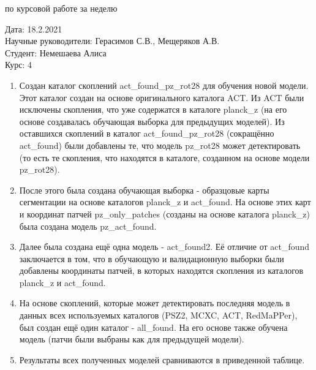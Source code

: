\documentclass{article}
\begin{document}
\begin{center}{ по курсовой работе за неделю\\}\end{center}
Дата: 18.2.2021\\
Научные руководители: Герасимов С.В., Мещеряков А.В.\\
Студент: Немешаева Алиса\\
Курс: 4\\

\renewcommand{\labelitemi}{$\blacksquare$}
\renewcommand\labelitemii{$\square$}
\begin{enumerate}
    \item Создан каталог скоплений act\_found\_pz\_rot28 для обучения новой модели. Этот каталог 
        создан на основе оригинального каталога ACT. Из ACT были исключены скопления, что уже 
        содержатся в каталоге planck\_z (на его основе создавалась обучающая выборка для предыдущих 
        моделей). Из оставшихся скоплений в каталог act\_found\_pz\_rot28 (сокращённо act\_found) 
        были добавлены те, что модель pz\_rot28 может детектировать (то есть те скопления, что 
        находятся в каталоге, созданном на основе модели pz\_rot28).\\
    \item После этого была создана обучающая выборка - образцовые карты сегментации на основе 
        каталогов planck\_z и act\_found. На основе этих карт и координат патчей pz\_only\_patches
        (созданы на основе каталога planck\_z) была создана модель pz\_act\_found.\\
    \item Далее была создана ещё одна модель - act\_found2. Её отличие от act\_found заключается в 
        том, что в обучающую и валидационную выборки были добавлены координаты патчей, в которых 
        находятся скопления из каталогов planck\_z и act\_found.\\
    \item На основе скоплений, которые может детектировать последняя модель в данных всех 
        используемых каталогов (PSZ2, MCXC, ACT, RedMaPPer), был создан ещё один каталог - 
        all\_found. На его основе также обучена модель (патчи были выбраны как для предыдущей 
        модели).\\
    \item Результаты всех полученных моделей сравниваются в приведенной таблице.\\
\end{enumerate}
\end{document}
